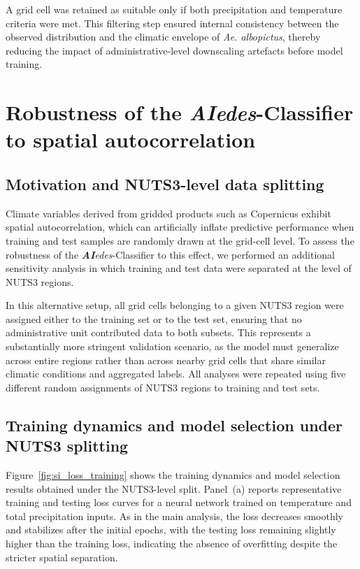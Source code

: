 \documentclass[11pt,a4paper]{article}
\begin{document}
A grid cell was retained as suitable only if both precipitation and temperature criteria were met. This filtering step ensured internal consistency between the observed distribution and the climatic envelope of \emph{Ae. albopictus}, thereby reducing the impact of administrative-level downscaling artefacts before model training.

\section{Robustness of the \textit{\textbf{AI}edes}-Classifier to spatial autocorrelation}
\label{sec:si_spatial}

\subsection{Motivation and NUTS3-level data splitting}

Climate variables derived from gridded products such as Copernicus exhibit spatial autocorrelation, which can artificially inflate predictive performance when training and test samples are randomly drawn at the grid-cell level. To assess the robustness of the \textit{\textbf{AI}edes}-Classifier to this effect, we performed an additional sensitivity analysis in which training and test data were separated at the level of NUTS3 regions.

In this alternative setup, all grid cells belonging to a given NUTS3 region were assigned either to the training set or to the test set, ensuring that no administrative unit contributed data to both subsets. This represents a substantially more stringent validation scenario, as the model must generalize across entire regions rather than across nearby grid cells that share similar climatic conditions and aggregated labels. All analyses were repeated using five different random assignments of NUTS3 regions to training and test sets.

\subsection{Training dynamics and model selection under NUTS3 splitting}

Figure~\ref{fig:si_loss_training} shows the training dynamics and model selection results obtained under the NUTS3-level split. Panel~(a) reports representative training and testing loss curves for a neural network trained on temperature and total precipitation inputs. As in the main analysis, the loss decreases smoothly and stabilizes after the initial epochs, with the testing loss remaining slightly higher than the training loss, indicating the absence of overfitting despite the stricter spatial separation.
\end{document}
